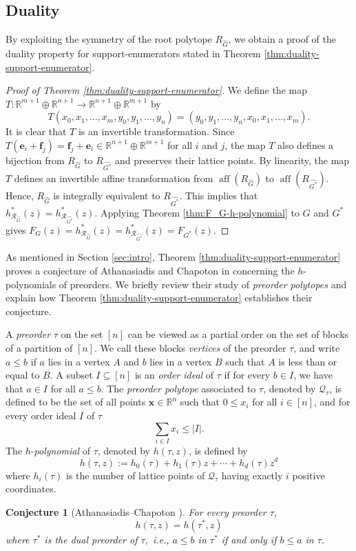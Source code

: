 \documentclass[11pt,a4paper]{article}
\newcommand{\vct}[1]{\boldsymbol{#1}}
\newcommand{\R}{\mathbb{R}}
\newcommand{\aff}{\operatorname{aff}}
\newcommand{\1}{\mathbf{1}}
\theoremstyle{plain}
\newtheorem{conjecture}[theorem]{Conjecture}
\theoremstyle{definition}
\begin{document}
\subsection{Duality}

By exploiting the symmetry of the root polytope $R_{\widehat G}$, we obtain a proof of the duality property for support-enumerators stated in Theorem \ref{thm:duality-support-enumerator}.
\begin{proof}[Proof of Theorem \ref{thm:duality-support-enumerator}]
We define the map $T:\R^{m+1}\oplus\R^{n+1}\longrightarrow \R^{n+1}\oplus\R^{m+1}$ by
$$T(x_0,x_1,\ldots,x_m,y_0,y_1,\ldots,y_n) = (y_0,y_1,\ldots,y_n,x_0,x_1,\ldots,x_m).$$ It is clear that $T$ is an invertible transformation. Since $T(\vct{e}_i + \vct{f}_j) = \vct{f}_j + \vct{e}_i \in \R^{n+1}\oplus \R^{m+1}$ for all $i$ and $j$, the map $T$ also defines a bijection from $R_{\widehat G}$ to $R_{\widehat {G^*}}$ and preserves their lattice points. By linearity, the map $T$ defines an invertible affine transformation from $\aff(R_{\widehat {G}})$ to $\aff(R_{\widehat {G^*}})$. Hence, $R_{\widehat {G}}$ is integrally equivalent to $R_{\widehat {G^*}}.$ This implies that $h^*_{\mathcal R_{\widehat G}}(z)
=h^*_{\mathcal R_{\widehat{G^*}}}(z).$ Applying Theorem \ref{thm:F_G-h-polynomial} to $G$ and $G^*$ gives
$F_G(z)=h^*_{\mathcal R_{\widehat G}}(z)
=h^*_{\mathcal R_{\widehat{G^*}}}(z)
=F_{G^*}(z).$
\end{proof}

As mentioned in Section \ref{sec:intro}, Theorem \ref{thm:duality-support-enumerator} proves a conjecture of Athanasiadis and Chapoton in \cite{chapoton2026} concerning the $h$-polynomials of preorders. We briefly review their study of \emph{preorder polytopes} and explain how Theorem \ref{thm:duality-support-enumerator} establishes their conjecture.

A \emph{preorder} $\tau$ on the set $[n]$ can be viewed as a partial order on the set of blocks of a partition of $[n].$ We call these blocks \emph{vertices} of the preorder $\tau$, and write $a \leq b$ if $a$ lies in a vertex $A$ and $b$ lies in a vertex $B$ such that $A$ is less than or equal to $B$. A subset $I \subseteq [n]$ is an \emph{order ideal} of $\tau$ if for every $b \in I$, we have that $a \in I$ for all $a \leq b.$ The \emph{preorder polytope} associated to $\tau$, denoted by $\mathcal{Q}_\tau$, is defined to be the set of all points $\vct{x} \in \R^n$ such that $0 \leq x_i$ for all $i \in [n]$, and for every order ideal $I$ of $\tau$
\[\sum_{i \in I}x_i \leq |I|.\]
The $h$-\textit{polynomial} of $\tau$, denoted by $h(\tau,z)$, is defined by
\[h(\tau,z):= h_0(\tau) + h_1(\tau)z +\cdots +h_d(\tau)z^d\]
where $h_i(\tau)$ is the number of lattice points of $\mathcal{Q}_\tau$ having exactly $i$ positive coordinates. 
\begin{conjecture}[Athanasiadis--Chapoton \cite{chapoton2026}]
For every preorder $\tau$,
\[h(\tau,z) = h(\tau^*,z)\]
where $\tau^*$ is the \emph{dual} preorder of $\tau,$ i.e., $a \leq b$ in $\tau^*$ if and only if $b \leq a$ in $\tau.$
\end{conjecture}
\end{document}
